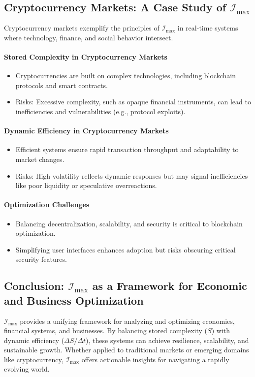 \documentclass[12pt]{article}
\begin{document}
\subsection{Cryptocurrency Markets: A Case Study of \(\mathcal{I}_{\text{max}}\)}
Cryptocurrency markets exemplify the principles of \(\mathcal{I}_{\text{max}}\) in real-time systems where technology, finance, and social behavior intersect.

\paragraph{Stored Complexity in Cryptocurrency Markets}
\begin{itemize}
    \item Cryptocurrencies are built on complex technologies, including blockchain protocols and smart contracts.
    \item Risks: Excessive complexity, such as opaque financial instruments, can lead to inefficiencies and vulnerabilities (e.g., protocol exploits).
\end{itemize}

\paragraph{Dynamic Efficiency in Cryptocurrency Markets}
\begin{itemize}
    \item Efficient systems ensure rapid transaction throughput and adaptability to market changes.
    \item Risks: High volatility reflects dynamic responses but may signal inefficiencies like poor liquidity or speculative overreactions.
\end{itemize}

\paragraph{Optimization Challenges}
\begin{itemize}
    \item Balancing decentralization, scalability, and security is critical to blockchain optimization.
    \item Simplifying user interfaces enhances adoption but risks obscuring critical security features.
\end{itemize}

\subsection{Conclusion: \(\mathcal{I}_{\text{max}}\) as a Framework for Economic and Business Optimization}
\(\mathcal{I}_{\text{max}}\) provides a unifying framework for analyzing and optimizing economies, financial systems, and businesses. By balancing stored complexity (\( S \)) with dynamic efficiency (\( \Delta S / \Delta t \)), these systems can achieve resilience, scalability, and sustainable growth. Whether applied to traditional markets or emerging domains like cryptocurrency, \(\mathcal{I}_{\text{max}}\) offers actionable insights for navigating a rapidly evolving world.
\end{document}
